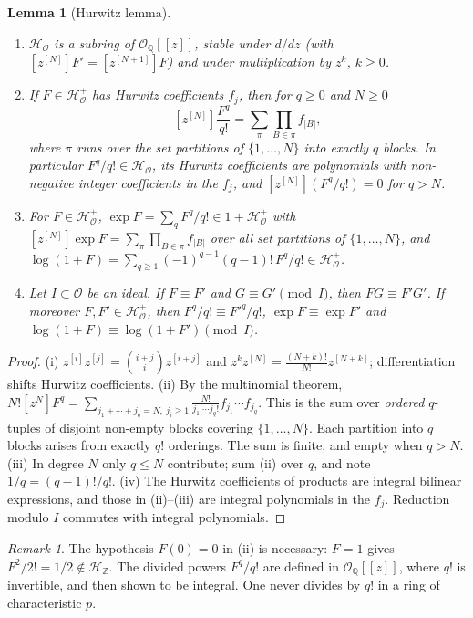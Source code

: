 \documentclass[11pt,reqno]{amsart}
\newtheorem{lemma}[theorem]{Lemma}
\theoremstyle{definition}
\theoremstyle{remark}
\newtheorem{remark}[theorem]{Remark}
\theoremstyle{plain}
\newcommand{\Z}{\mathbb Z}
\newcommand{\Q}{\mathbb Q}
\newcommand{\Hur}{\mathcal H}
\newcommand{\hc}[1]{[z^{[#1]}]}
\begin{document}
\begin{lemma}[Hurwitz lemma]\label{lem:hurwitz}
\leavevmode
\begin{enumerate}[label=\textup{(\roman*)}]
\item $\Hur_{\mathcal O}$ is a subring of $\mathcal O_\Q[[z]]$, stable under $d/dz$ (with $\hc N F'=\hc{N+1}F$) and under multiplication by $z^k$, $k\ge0$.
\item If $F\in\Hur^+_{\mathcal O}$ has Hurwitz coefficients $f_j$, then for $q\ge0$ and $N\ge0$
\[
\hc N\frac{F^q}{q!}=\sum_{\pi}\prod_{B\in\pi}f_{|B|},
\]
where $\pi$ runs over the set partitions of $\{1,\dots,N\}$ into exactly $q$ blocks. In particular $F^q/q!\in\Hur_{\mathcal O}$, its Hurwitz coefficients are polynomials with non-negative integer coefficients in the $f_j$, and $\hc N(F^q/q!)=0$ for $q>N$.
\item For $F\in\Hur^+_{\mathcal O}$, $\exp F=\sum_qF^q/q!\in1+\Hur^+_{\mathcal O}$ with $\hc N\exp F=\sum_{\pi}\prod_{B\in\pi}f_{|B|}$ over all set partitions of $\{1,\dots,N\}$, and $\log(1+F)=\sum_{q\ge1}(-1)^{q-1}(q-1)!\,F^q/q!\in\Hur^+_{\mathcal O}$.
\item Let $I\subset\mathcal O$ be an ideal. If $F\equiv F'$ and $G\equiv G'\pmod I$, then $FG\equiv F'G'$. If moreover $F,F'\in\Hur^+_{\mathcal O}$, then $F^q/q!\equiv F'^q/q!$, $\exp F\equiv\exp F'$ and $\log(1+F)\equiv\log(1+F')\pmod I$.
\end{enumerate}
\end{lemma}

\begin{proof}
(i) $z^{[i]}z^{[j]}=\binom{i+j}{i}z^{[i+j]}$ and $z^kz^{[N]}=\frac{(N+k)!}{N!}z^{[N+k]}$; differentiation shifts Hurwitz coefficients. (ii) By the multinomial theorem, $N![z^N]F^q=\sum_{j_1+\cdots+j_q=N,\ j_i\ge1}\frac{N!}{j_1!\cdots j_q!}f_{j_1}\cdots f_{j_q}$. This is the sum over \emph{ordered} $q$-tuples of disjoint non-empty blocks covering $\{1,\dots,N\}$. Each partition into $q$ blocks arises from exactly $q!$ orderings. The sum is finite, and empty when $q>N$. (iii) In degree $N$ only $q\le N$ contribute; sum (ii) over $q$, and note $1/q=(q-1)!/q!$. (iv) The Hurwitz coefficients of products are integral bilinear expressions, and those in (ii)--(iii) are integral polynomials in the $f_j$. Reduction modulo $I$ commutes with integral polynomials.
\end{proof}

\begin{remark}
The hypothesis $F(0)=0$ in (ii) is necessary: $F=1$ gives $F^2/2!=1/2\notin\Hur_\Z$. The divided powers $F^q/q!$ are defined in $\mathcal O_\Q[[z]]$, where $q!$ is invertible, and then shown to be integral. One never divides by $q!$ in a ring of characteristic $p$.
\end{remark}
\end{document}
